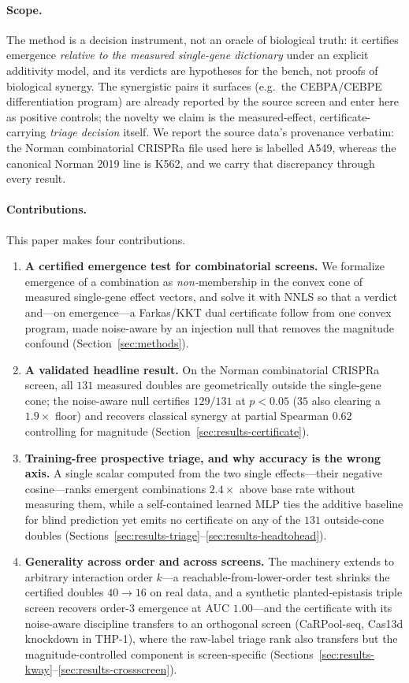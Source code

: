 \paragraph{Scope.}
The method is a decision instrument, not an oracle of biological truth: it certifies emergence
\emph{relative to the measured single-gene dictionary} under an explicit additivity model, and
its verdicts are hypotheses for the bench, not proofs of biological synergy. The synergistic
pairs it surfaces (e.g.\ the CEBPA/CEBPE differentiation program) are already reported by the
source screen \citep{Norman2019} and enter here as positive controls; the novelty we claim is the
measured-effect, certificate-carrying \emph{triage decision} itself. We report the source data's
provenance verbatim: the Norman combinatorial CRISPRa file used here is labelled A549, whereas the
canonical Norman 2019 line is K562, and we carry that discrepancy through every result.

\paragraph{Contributions.}
This paper makes four contributions.
\begin{enumerate}
\item \textbf{A certified emergence test for combinatorial screens.} We formalize emergence of a
combination as \emph{non-}membership in the convex cone of measured single-gene effect vectors,
and solve it with NNLS so that a verdict and---on emergence---a Farkas/KKT dual certificate follow
from one convex program, made noise-aware by an injection null that removes the magnitude confound
(Section~\ref{sec:methods}).
\item \textbf{A validated headline result.} On the Norman combinatorial CRISPRa screen, all $131$
measured doubles are geometrically outside the single-gene cone; the noise-aware null certifies
$129/131$ at $p<0.05$ ($35$ also clearing a $1.9\times$ floor) and recovers classical synergy at
partial Spearman $0.62$ controlling for magnitude (Section~\ref{sec:results-certificate}).
\item \textbf{Training-free prospective triage, and why accuracy is the wrong axis.} A single
scalar computed from the two single effects---their negative cosine---ranks emergent combinations
$2.4\times$ above base rate without measuring them, while a self-contained learned MLP ties the
additive baseline for blind prediction yet emits no certificate on any of the $131$ outside-cone
doubles (Sections~\ref{sec:results-triage}--\ref{sec:results-headtohead}).
\item \textbf{Generality across order and across screens.} The machinery extends to arbitrary
interaction order $k$---a reachable-from-lower-order test shrinks the certified doubles $40\to16$
on real data, and a synthetic planted-epistasis triple screen recovers order-3 emergence at AUC
$1.00$---and the certificate with its noise-aware discipline transfers to an orthogonal screen
(CaRPool-seq, Cas13d knockdown in THP-1), where the raw-label triage rank also transfers but the
magnitude-controlled component is screen-specific
(Sections~\ref{sec:results-kway}--\ref{sec:results-crossscreen}).
\end{enumerate}

